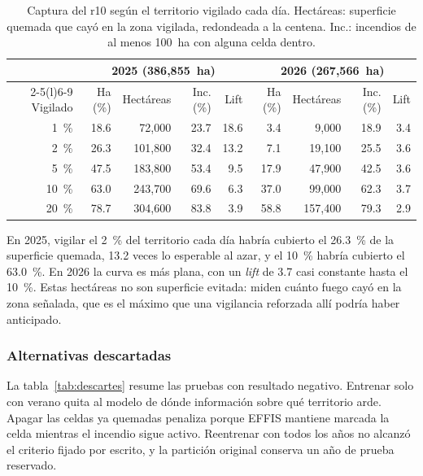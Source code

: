 \documentclass[10pt,a4paper]{article}
\begin{document}
\begin{table}[H]
  \centering
  \caption{Captura del r10 según el territorio vigilado cada día. Hectáreas:
  superficie quemada que cayó en la zona vigilada, redondeada a la centena.
  Inc.: incendios de al menos 100~ha con alguna celda dentro.}
  \label{tab:captura}
  \footnotesize
  \begin{tabular}{@{}rrrrrrrrr@{}}
    \toprule
    & \multicolumn{4}{c}{2025 (386,855~ha)} & \multicolumn{4}{c}{2026 (267,566~ha)} \\
    \cmidrule(lr){2-5}\cmidrule(l){6-9}
    Vigilado & Ha (\%) & Hectáreas & Inc. (\%) & Lift & Ha (\%) & Hectáreas & Inc. (\%) & Lift \\
    \midrule
    1~\%   & 18.6 & 72,000  & 23.7 & 18.6 & 3.4  & 9,000   & 18.9 & 3.4 \\
    2~\%   & 26.3 & 101,800 & 32.4 & 13.2 & 7.1  & 19,100  & 25.5 & 3.6 \\
    5~\%   & 47.5 & 183,800 & 53.4 & 9.5  & 17.9 & 47,900  & 42.5 & 3.6 \\
    10~\%  & 63.0 & 243,700 & 69.6 & 6.3  & 37.0 & 99,000  & 62.3 & 3.7 \\
    20~\%  & 78.7 & 304,600 & 83.8 & 3.9  & 58.8 & 157,400 & 79.3 & 2.9 \\
    \bottomrule
  \end{tabular}
\end{table}

En 2025, vigilar el 2~\% del territorio cada día habría cubierto el 26.3~\% de
la superficie quemada, 13.2 veces lo esperable al azar, y el 10~\% habría
cubierto el 63.0~\%. En 2026 la curva es más plana, con un \emph{lift} de 3.7
casi constante hasta el 10~\%. Estas hectáreas no son superficie evitada: miden
cuánto fuego cayó en la zona señalada, que es el máximo que una vigilancia
reforzada allí podría haber anticipado.



\subsubsection{Alternativas descartadas}
\label{an:b2-descartes}

La tabla~\ref{tab:descartes} resume las pruebas con resultado negativo. Entrenar
solo con verano quita al modelo de dónde información sobre qué territorio arde.
Apagar las celdas ya quemadas penaliza porque EFFIS mantiene marcada la celda
mientras el incendio sigue activo. Reentrenar con todos los años no alcanzó el
criterio fijado por escrito, y la partición original conserva un año de prueba
reservado.
\end{document}
